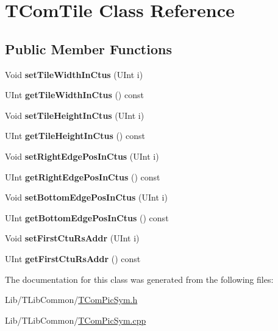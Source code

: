 \hypertarget{class_t_com_tile}{}\section{T\+Com\+Tile Class Reference}
\label{class_t_com_tile}
\subsection*{Public Member Functions}
\begin{DoxyCompactItemize}
\item 
\mbox{\label{class_t_com_tile_acc6e91457f66bf3acf41a92f07937d15}} 
Void {\bfseries set\+Tile\+Width\+In\+Ctus} (U\+Int i)
\item 
\mbox{\label{class_t_com_tile_a5bd52e246fafcb0dcaa5a4e7909b80ef}} 
U\+Int {\bfseries get\+Tile\+Width\+In\+Ctus} () const
\item 
\mbox{\label{class_t_com_tile_ad1966f3650836defad7352cca68aab84}} 
Void {\bfseries set\+Tile\+Height\+In\+Ctus} (U\+Int i)
\item 
\mbox{\label{class_t_com_tile_a5c3515ebd4544fa725007aa8bb97a903}} 
U\+Int {\bfseries get\+Tile\+Height\+In\+Ctus} () const
\item 
\mbox{\label{class_t_com_tile_a9d5fb4104ff80482256bb85a73723723}} 
Void {\bfseries set\+Right\+Edge\+Pos\+In\+Ctus} (U\+Int i)
\item 
\mbox{\label{class_t_com_tile_a49ce18883ca83ecaa43c364b3f2b7040}} 
U\+Int {\bfseries get\+Right\+Edge\+Pos\+In\+Ctus} () const
\item 
\mbox{\label{class_t_com_tile_a393e6717d1a2106eec30149a5be33eb5}} 
Void {\bfseries set\+Bottom\+Edge\+Pos\+In\+Ctus} (U\+Int i)
\item 
\mbox{\label{class_t_com_tile_a630d014b8b32e951b48af095eb88761a}} 
U\+Int {\bfseries get\+Bottom\+Edge\+Pos\+In\+Ctus} () const
\item 
\mbox{\label{class_t_com_tile_a27156c9e5943c923adfbe7b07d1d658e}} 
Void {\bfseries set\+First\+Ctu\+Rs\+Addr} (U\+Int i)
\item 
\mbox{\label{class_t_com_tile_a5e5a93f6818e56d859e52ebaab81894b}} 
U\+Int {\bfseries get\+First\+Ctu\+Rs\+Addr} () const
\end{DoxyCompactItemize}
{\bf }\par



The documentation for this class was generated from the following files\+:\begin{DoxyCompactItemize}
\item 
Lib/\+T\+Lib\+Common/\hyperlink{_t_com_pic_sym_8h}{T\+Com\+Pic\+Sym.\+h}\item 
Lib/\+T\+Lib\+Common/\hyperlink{_t_com_pic_sym_8cpp}{T\+Com\+Pic\+Sym.\+cpp}\end{DoxyCompactItemize}
